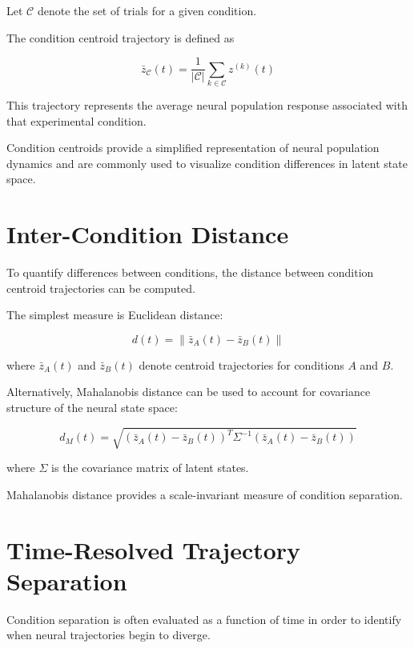 \documentclass[11pt]{report}
\begin{document}
Let $\mathcal{C}$ denote the set of trials for a given condition.

The condition centroid trajectory is defined as

\begin{equation}
\bar{z}_{\mathcal{C}}(t) =
\frac{1}{|\mathcal{C}|}
\sum_{k \in \mathcal{C}} z^{(k)}(t)
\end{equation}

This trajectory represents the average neural population response
associated with that experimental condition.

Condition centroids provide a simplified representation of neural
population dynamics and are commonly used to visualize condition
differences in latent state space.

\section{Inter-Condition Distance}

To quantify differences between conditions, the distance between
condition centroid trajectories can be computed.

The simplest measure is Euclidean distance:

\begin{equation}
d(t) =
\left\|
\bar{z}_{A}(t) -
\bar{z}_{B}(t)
\right\|
\end{equation}

where $\bar{z}_{A}(t)$ and $\bar{z}_{B}(t)$ denote centroid trajectories
for conditions $A$ and $B$.

Alternatively, Mahalanobis distance can be used to account for
covariance structure of the neural state space:

\begin{equation}
d_M(t) =
\sqrt{
(\bar{z}_A(t)-\bar{z}_B(t))^T
\Sigma^{-1}
(\bar{z}_A(t)-\bar{z}_B(t))
}
\end{equation}

where $\Sigma$ is the covariance matrix of latent states.

Mahalanobis distance provides a scale-invariant measure of
condition separation.

\section{Time-Resolved Trajectory Separation}

Condition separation is often evaluated as a function of time in
order to identify when neural trajectories begin to diverge.
\end{document}
